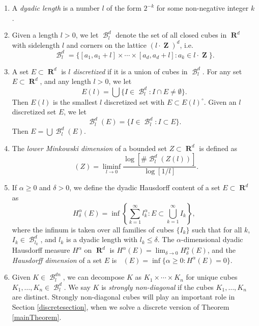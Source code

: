 \documentclass[dvipsnames,letterpaper,12pt]{article}
\numberwithin{equation}{section}
\theoremstyle{plain}
\theoremstyle{remark}
\DeclareMathOperator{\hausdim}{\dim_{\mathbf{H}}}
\DeclareMathOperator{\lowminkdim}{\underline{\dim}_{\mathbf{M}}}
\DeclareMathOperator{\RR}{\mathbf{R}}
\DeclareMathOperator{\ZZ}{\mathbf{Z}}
\DeclareMathOperator{\setcolon}{\colon}
\DeclareMathOperator{\B}{\mathcal{B}}
\begin{document}
\begin{enumerate}
	\item\label{defDyadicLength} A {\it dyadic length} is a number $l$ of the form $2^{-k}$ for some non-negative integer $k$.

	\item\label{defDyadicGrid} Given a length $l > 0$, we let $\B^d_l$ denote the set of all closed cubes in $\RR^d$ with sidelength $l$ and corners on the lattice $(l \cdot \ZZ)^d$, i.e.
	\[ \B^d_l = \{ [a_1, a_1 + l] \times \cdots \times [a_d, a_d+l] \setcolon a_k \in l \cdot \ZZ \}. \]

	\item A set $E \subset \RR^d$ is \emph{$l$ discretized} if it is a union of cubes in $\B^d_l$. For any set $E \subset \RR^d$, and any length $l > 0$, we let
	\[ E(l) = \bigcup \{ I \in \B^d_l \setcolon I \cap E \neq \emptyset \}. \]
	Then $E(l)$ is the smallest $l$ discretized set with $E \subset E(l)^\circ$. Given an $l$ discretized set $E$, we let
	\[ \B^d_l(E) = \{ I \in \B^d_l \setcolon I \subset E \}. \]
	Then $E = \bigcup \B^d_l(E)$.

	\item\label{defnMinkowskiDim} The {\it lower Minkowski dimension} of a bounded set $Z \subset \RR^d$ is defined as
	\[ \lowminkdim(Z) = \liminf_{l \to 0} \frac{\log \left[ \# \B^d_l(Z(l)) \right]}{\log[ 1/l ]}. \]

	\item\label{defHausdorffDim} If $\alpha \geq 0$ and $\delta > 0$, we define the dyadic Hausdorff content of a set $E\subset\RR^d$ as 
	\[ H^\alpha_\delta(E) = \inf \left\{ \sum_{k = 1}^\infty l_k^\alpha \setcolon E \subset \bigcup_{k = 1}^\infty I_k \right\}, \]
	where the infinum is taken over all families of cubes $\{ I_k \}$ such that for all $k$, $I_k \in \B^d_{l_k}$, and $l_k$ is a dyadic length with $l_k \leq \delta$. The $\alpha$-dimensional dyadic Hausdorff measure $H^\alpha$ on $\RR^d$ is $H^\alpha(E) = \lim_{\delta \to 0} H_\delta^\alpha(E)$, and the {\it Hausdorff dimension} of a set $E$ is $\hausdim(E) = \inf \{ \alpha \geq 0 \setcolon H^\alpha(E) = 0 \}$.

	\item\label{defStronglyNonDiagonal} Given $K \in \B^{dn}_l$, we can decompose $K$ as $K_1 \times \cdots \times K_n$ for unique cubes $K_1, \dots, K_n \in \B_l^d$. We say $K$ is {\it strongly non-diagonal} if the cubes $K_1, \dots, K_n$ are distinct. Strongly non-diagonal cubes will play an important role in Section \ref{discretesection}, when we solve a discrete version of Theorem \ref{mainTheorem}.


\end{enumerate}
\end{document}
